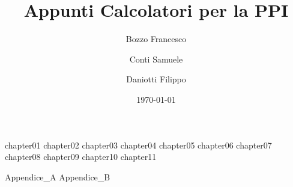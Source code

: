\documentclass[
	,a4paper
	,12pt
	,oneside
]{book}
\author{Bozzo Francesco \and Conti Samuele \and Daniotti Filippo}
\title{Appunti Calcolatori per la PPI}
\date{\today}
\begin{document}
\frontmatter

	\maketitle
	\tableofcontents

\mainmatter

	{chapter01}
	{chapter02}
	{chapter03}
	{chapter04}
	{chapter05}
	{chapter06} %
	{chapter07}
	{chapter08}
	{chapter09}
	{chapter10}
	{chapter11}

	\appendix
	{Appendice_A}
	{Appendice_B}
\backmatter
\end{document}
